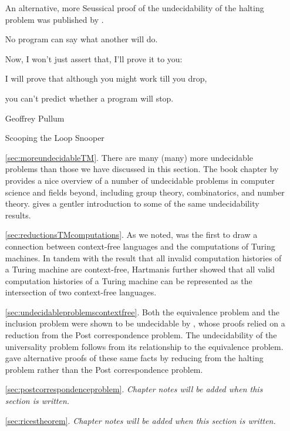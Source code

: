 \begin{enumerate}
An alternative, more Seussical proof of the undecidability of the halting problem was published by \citet{Pullum2000LoopSnooper}. \par
\epigraph{No program can say what another will do.\par
Now, I won't just assert that, I'll prove it to you:\par
I will prove that although you might work till you drop,\par
you can't predict whether a program will stop.}{Geoffrey Pullum}{Scooping the Loop Snooper}{}
\vspace{1em}

\item[\ref{sec:moreundecidableTM}.] There are many (many) more undecidable problems than those we have discussed in this section. The book chapter by \citet{Davis1977UnsolvableProblems} provides a nice overview of a number of undecidable problems in computer science and fields beyond, including group theory, combinatorics, and number theory. \citet{Harkleroad1996WhatComputersCantDo} gives a gentler introduction to some of the same undecidability results.

\item[\ref{sec:reductionsTMcomputations}.] As we noted, \citet{Hartmanis1967CFLsAndTMComputations} was the first to draw a connection between context-free languages and the computations of Turing machines. In tandem with the result that all invalid computation histories of a Turing machine are context-free, Hartmanis further showed that all valid computation histories of a Turing machine can be represented as the intersection of two context-free languages.

\item[\ref{sec:undecidableproblemscontextfree}.] Both the equivalence problem and the inclusion problem were shown to be undecidable by \citet*{BarHillel1961FormalPropertiesPhraseStructureGrammars}, whose proofs relied on a reduction from the Post correspondence problem. The undecidability of the universality problem follows from its relationship to the equivalence problem. \citet{Hartmanis1967CFLsAndTMComputations} gave alternative proofs of these same facts by reducing from the halting problem rather than the Post correspondence problem.

\item[\ref{sec:postcorrespondenceproblem}.] \textsl{Chapter notes will be added when this section is written.}

\item[\ref{sec:ricestheorem}.] \textsl{Chapter notes will be added when this section is written.}
\end{enumerate}